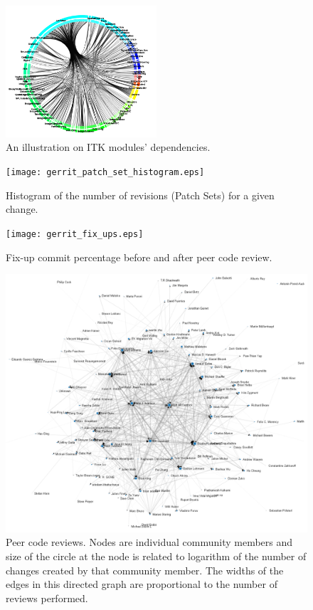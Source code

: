 \documentclass{frontiersENG} %
\begin{document}
\begin{figure}
  \centering
    \includegraphics[width=0.5\textwidth]{itk_module_dependency.png}
    \caption{An illustration on ITK modules' dependencies.}
    \label{fig:itk_module_dependency}
\end{figure}

\begin{figure}
  \centering
    \texttt{[image: gerrit\_patch\_set\_histogram.eps]}
    \caption{Histogram of the number of revisions (Patch Sets) for a given change.}
    \label{fig:gerrit_patch_set_histogram}
\end{figure}

\begin{figure}
  \centering
    \texttt{[image: gerrit\_fix\_ups.eps]}
    \caption{Fix-up commit percentage before and after peer code review.}
    \label{fig:gerrit_fix_ups}
\end{figure}

\begin{figure}
  \centering
    \showthe\textwidth
    \includegraphics[width=1.0\textwidth]{GerritGraphRender.png}
    \caption{Peer code reviews.  Nodes are individual community members and
      size of the circle at the node is related to logarithm of the number of changes
      created by that community member.  The widths of the edges in this directed
      graph are proportional to the number of reviews performed.}
    \label{fig:gerrit_fix_ups}
\end{figure}
\end{document}

